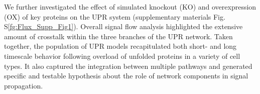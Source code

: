 \documentclass[fleqn,10pt]{wlscirep}
\begin{document}
We further investigated the effect of simulated knockout (KO) and overexpression (OX) of key proteins on the UPR system
(supplementary materials Fig. S\ref{fg:Flux_Supp_Fig1}).
Overall signal flow analysis highlighted the extensive amount of crosstalk within the three branches of the UPR network.
Taken together, the population of UPR models recapitulated both short- and long timescale behavior following overload of unfolded proteins in a variety of cell types.
It also captured the integration between multiple pathways and generated specific and testable hypothesis about the role of network components in signal propagation.
\end{document}
